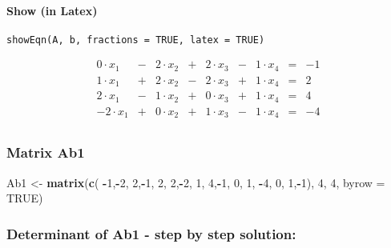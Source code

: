 \documentclass[
  10pt,
  a4paper,
]{article}
\newenvironment{Shaded}{\begin{snugshade}}{\end{snugshade}}
\newcommand{\AttributeTok}[1]{\textcolor[rgb]{0.13,0.29,0.53}{#1}}
\newcommand{\ConstantTok}[1]{\textcolor[rgb]{0.56,0.35,0.01}{#1}}
\newcommand{\DecValTok}[1]{\textcolor[rgb]{0.00,0.00,0.81}{#1}}
\newcommand{\FunctionTok}[1]{\textcolor[rgb]{0.13,0.29,0.53}{\textbf{#1}}}
\newcommand{\NormalTok}[1]{#1}
\newcommand{\OtherTok}[1]{\textcolor[rgb]{0.56,0.35,0.01}{#1}}
\newcommand{\SpecialCharTok}[1]{\textcolor[rgb]{0.81,0.36,0.00}{\textbf{#1}}}
\begin{document}
\hypertarget{show-in-latex}{%
\paragraph{Show (in Latex)}\label{show-in-latex}}

\begin{verbatim}
showEqn(A, b, fractions = TRUE, latex = TRUE)
\end{verbatim}

\[
\begin{array}{lllllllll}
 0 \cdot x_1 &-& 2 \cdot x_2 &+& 2 \cdot x_3 &-& 1 \cdot x_4  &=&  -1 \\ 
 1 \cdot x_1 &+& 2 \cdot x_2 &-& 2 \cdot x_3 &+& 1 \cdot x_4  &=&   2 \\ 
 2 \cdot x_1 &-& 1 \cdot x_2 &+& 0 \cdot x_3 &+& 1 \cdot x_4  &=&   4 \\ 
-2 \cdot x_1 &+& 0 \cdot x_2 &+& 1 \cdot x_3 &-& 1 \cdot x_4  &=&  -4 \\ 
\end{array}
\]

\hypertarget{matrix-ab1}{%
\subsubsection{Matrix Ab1}\label{matrix-ab1}}

\begin{Shaded}
\begin{Highlighting}[]
\NormalTok{Ab1 }\OtherTok{\textless{}{-}} \FunctionTok{matrix}\NormalTok{(}\FunctionTok{c}\NormalTok{( }\SpecialCharTok{{-}}\DecValTok{1}\NormalTok{,}\SpecialCharTok{{-}}\DecValTok{2}\NormalTok{, }\DecValTok{2}\NormalTok{,}\SpecialCharTok{{-}}\DecValTok{1}\NormalTok{,}
                 \DecValTok{2}\NormalTok{, }\DecValTok{2}\NormalTok{,}\SpecialCharTok{{-}}\DecValTok{2}\NormalTok{, }\DecValTok{1}\NormalTok{,}
                 \DecValTok{4}\NormalTok{,}\SpecialCharTok{{-}}\DecValTok{1}\NormalTok{, }\DecValTok{0}\NormalTok{, }\DecValTok{1}\NormalTok{,}
                \SpecialCharTok{{-}}\DecValTok{4}\NormalTok{, }\DecValTok{0}\NormalTok{, }\DecValTok{1}\NormalTok{,}\SpecialCharTok{{-}}\DecValTok{1}\NormalTok{), }\DecValTok{4}\NormalTok{, }\DecValTok{4}\NormalTok{, }\AttributeTok{byrow =} \ConstantTok{TRUE}\NormalTok{)}
\end{Highlighting}
\end{Shaded}

\hypertarget{determinant-of-ab1---step-by-step-solution}{%
\subsubsection{Determinant of Ab1 - step by step
solution:}\label{determinant-of-ab1---step-by-step-solution}}
\end{document}
